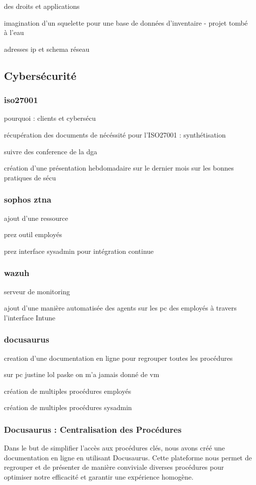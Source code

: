 des droits et applications

imagination d'un squelette pour une base de données d'inventaire - projet tombé à l'eau

adresses ip et schema réseau

\subsection{Cybersécurité}
\subsubsection{iso27001}
pourquoi : clients et cybersécu

récupération des documents de nécéssité pour l'ISO27001 : synthétisation

suivre des conference de la dga

création d'une présentation hebdomadaire sur le dernier mois sur les bonnes pratiques de sécu

\subsubsection{sophos ztna}
ajout d'une ressource 

prez outil employés

prez interface sysadmin pour intégration continue   

\subsubsection{wazuh}
serveur de monitoring

ajout d'une manière automatisée des agents sur les pc des employés à travers l'interface Intune

\subsubsection{docusaurus}
creation d'une documentation en ligne pour regrouper toutes les procédures

sur pc justine lol paske on m'a jamais donné de vm

création de multiples procédures employés

création de multiples procédures sysadmin
\newpage
\subsubsection{Docusaurus : Centralisation des Procédures}
Dans le but de simplifier l'accès aux procédures clés, nous avons créé une documentation en ligne en utilisant Docusaurus.
Cette plateforme nous permet de regrouper et de présenter de manière conviviale diverses procédures pour optimiser notre efficacité et garantir une expérience homogène.

